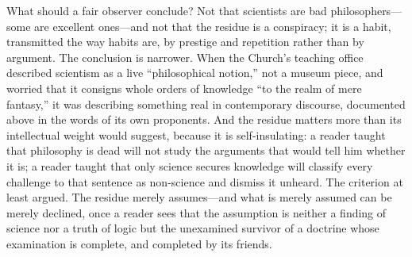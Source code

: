 What should a fair observer conclude? Not that scientists are bad philosophers---some are excellent ones---and not that the residue is a conspiracy; it is a habit, transmitted the way habits are, by prestige and repetition rather than by argument. The conclusion is narrower. When the Church's teaching office described scientism as a live ``philosophical notion,'' not a museum piece, and worried that it consigns whole orders of knowledge ``to the realm of mere fantasy,'' it was describing something real in contemporary discourse, documented above in the words of its own proponents. And the residue matters more than its intellectual weight would suggest, because it is self-insulating: a reader taught that philosophy is dead will not study the arguments that would tell him whether it is; a reader taught that only science secures knowledge will classify every challenge to that sentence as non-science and dismiss it unheard. The criterion at least argued. The residue merely assumes---and what is merely assumed can be merely declined, once a reader sees that the assumption is neither a finding of science nor a truth of logic but the unexamined survivor of a doctrine whose examination is complete, and completed by its friends.
